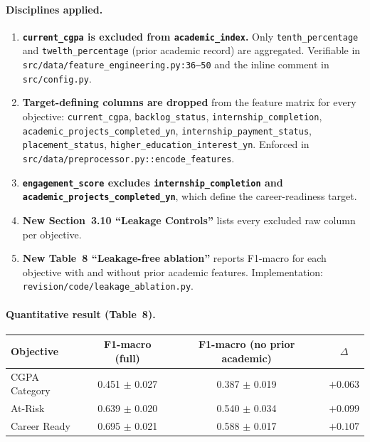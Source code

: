 \documentclass[11pt,a4paper]{article}
\newcommand{\filebox}[1]{\texttt{\small #1}}
\newcommand{\sectref}[1]{Section~#1}
\newcommand{\stress}[1]{\textbf{#1}}
\begin{document}
\begin{itemize}
\paragraph{Disciplines applied.}
\begin{enumerate}
  \item \stress{\texttt{current\_cgpa} is excluded from \texttt{academic\_index}.} Only \texttt{tenth\_percentage} and \texttt{twelth\_percentage} (prior academic record) are aggregated. Verifiable in \filebox{src/data/feature\_engineering.py:36--50} and the inline comment in \filebox{src/config.py}.
  \item \stress{Target-defining columns are dropped} from the feature matrix for every objective: \texttt{current\_cgpa}, \texttt{backlog\_status}, \texttt{internship\_completion}, \texttt{academic\_projects\_completed\_yn}, \texttt{internship\_payment\_status}, \texttt{placement\_status}, \texttt{higher\_education\_interest\_yn}. Enforced in \filebox{src/data/preprocessor.py::encode\_features}.
  \item \stress{\texttt{engagement\_score} excludes \texttt{internship\_completion} and \texttt{academic\_projects\_completed\_yn}}, which define the career-readiness target.
  \item \stress{New \sectref{3.10} ``Leakage Controls''} lists every excluded raw column per objective.
  \item \stress{New Table~8 ``Leakage-free ablation''} reports F1-macro for each objective with and without prior academic features. Implementation: \filebox{revision/code/leakage\_ablation.py}.
\end{enumerate}

\paragraph{Quantitative result (Table~8).}

\begin{center}\small
\begin{tabular}{l c c c}
\toprule
\textbf{Objective} & \textbf{F1-macro (full)} & \textbf{F1-macro (no prior academic)} & \textbf{$\Delta$} \\
\midrule
CGPA Category & 0.451 $\pm$ 0.027 & 0.387 $\pm$ 0.019 & $+0.063$ \\
At-Risk       & 0.639 $\pm$ 0.020 & 0.540 $\pm$ 0.034 & $+0.099$ \\
Career Ready  & 0.695 $\pm$ 0.021 & 0.588 $\pm$ 0.017 & $+0.107$ \\
\bottomrule
\end{tabular}
\end{center}


\end{itemize}
\end{document}
